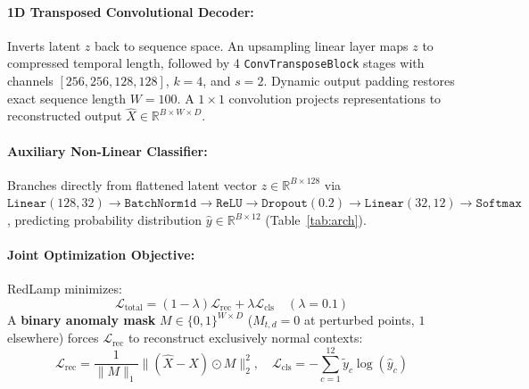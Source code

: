 \documentclass[sigconf,nonacm]{acmart}
\begin{document}
\paragraph{1D Transposed Convolutional Decoder:} Inverts latent $z$ back to sequence space. An upsampling linear layer maps $z$ to compressed temporal length, followed by 4 \texttt{ConvTransposeBlock} stages with channels $[256, 256, 128, 128]$, $k=4$, and $s=2$. Dynamic output padding restores exact sequence length $W=100$. A $1 \times 1$ convolution projects representations to reconstructed output $\hat{X} \in \mathbb{R}^{B \times W \times D}$.

\paragraph{Auxiliary Non-Linear Classifier:} Branches directly from flattened latent vector $z \in \mathbb{R}^{B \times 128}$ via $\texttt{Linear}(128, 32) \rightarrow \texttt{BatchNorm1d} \rightarrow \texttt{ReLU} \rightarrow \texttt{Dropout}(0.2) \rightarrow \texttt{Linear}(32, 12) \rightarrow \texttt{Softmax}$, predicting probability distribution $\hat{y} \in \mathbb{R}^{B \times 12}$ (Table~\ref{tab:arch}).

\paragraph{Joint Optimization Objective:} RedLamp minimizes:
\begin{equation}
    \mathcal{L}_{\text{total}} = (1 - \lambda)\mathcal{L}_{\text{rec}} + \lambda\mathcal{L}_{\text{cls}} \quad (\lambda = 0.1)
\end{equation}
A \textbf{binary anomaly mask} $M \in \{0, 1\}^{W \times D}$ ($M_{t,d}=0$ at perturbed points, $1$ elsewhere) forces $\mathcal{L}_{\text{rec}}$ to reconstruct exclusively normal contexts:
\begin{equation}
    \mathcal{L}_{\text{rec}} = \frac{1}{\|M\|_1} \| (\hat{X} - X) \odot M \|_2^2, \quad \mathcal{L}_{\text{cls}} = -\sum_{c=1}^{12} \tilde{y}_c \log(\hat{y}_c)
\end{equation}
\end{document}
